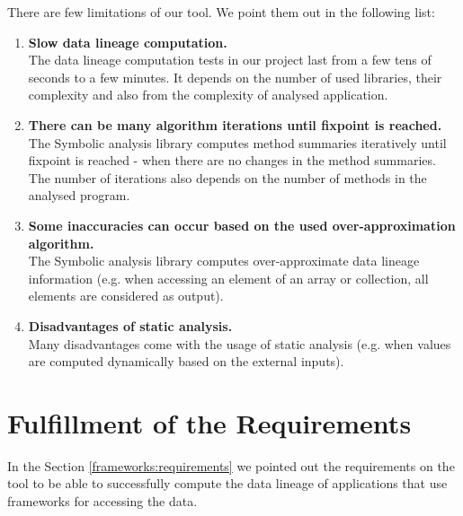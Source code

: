 There are few limitations of our \ToolName tool.
We point them out in the following list:
\begin{enumerate}
  \item \textbf{Slow data lineage computation.} \\
    The data lineage computation tests in our project last from
    a few tens of seconds to a few minutes. It depends on the
    number of used libraries, their complexity and also from the complexity
    of analysed application.
  \item \textbf{There can be many algorithm iterations until fixpoint is reached.} \\
    The Symbolic analysis library computes method summaries iteratively until
    fixpoint is reached - when there are no changes in the method summaries.
    The number of iterations also depends on the number of methods in the analysed program.
  \item \textbf{Some inaccuracies can occur based on the used over-approximation algorithm.} \\
    The Symbolic analysis library computes over-approximate data lineage information (e.g. when accessing
    an element of an array or collection, all elements are considered as output).
  \item \textbf{Disadvantages of static analysis.} \\
    Many disadvantages come with the usage of static analysis
    (e.g. when values are computed dynamically based on the external inputs).
\end{enumerate}



\section{Fulfillment of the Requirements}

In the Section \ref{frameworks:requirements} we pointed out the requirements
on the \ToolName tool to be able to successfully compute the data lineage of
applications that use frameworks for accessing the data.

